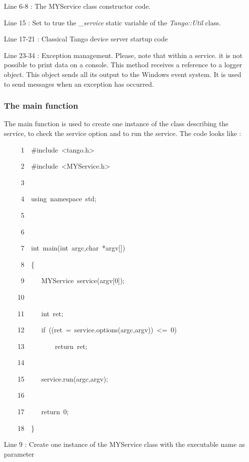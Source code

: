 

Line 6-8 : The MYService class constructor code.

Line 15 : Set to true the \emph{\_service} static variable of the
\emph{Tango::Util} class.

Line 17-21 : Classical Tango device server startup code

Line 23-34 : Exception management. Please, note that within a service.
it is not possible to print data on a console. This method receives
a reference to a logger object. This object sends all
its output to the Windows event system. It is used to
send messages when an exception has occurred.


\subsubsection{The main function}

The main function is used to create one instance of the class describing
the service, to check the service option and to run the service. The
code looks like :


\begin{lyxcode}
~~~~~1~~\#include~<tango.h>

~~~~~2~~\#include~<MYService.h>

~~~~~3~~

~~~~~4~~using~namespace~std;

~~~~~5~~

~~~~~6~~

~~~~~7~~int~main(int~argc,char~{*}argv{[}{]})

~~~~~8~~\{

~~~~~9~~~~~MYService~service(argv{[}0{]});

~~~~10~~~~~~~~~~

~~~~11~~~~~int~ret;

~~~~12~~~~~if~((ret~=~service.options(argc,argv))~<=~0)

~~~~13~~~~~~~~~return~ret;

~~~~14~~~~~~~~~~

~~~~15~~~~~service.run(argc,argv);

~~~~16~~~~~~~~~~

~~~~17~~~~~return~0;

~~~~18~~\}
\end{lyxcode}


Line 9 : Create one instance of the MYService class with the executable
name as parameter

